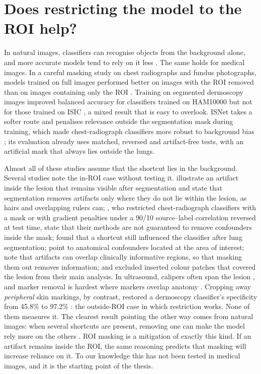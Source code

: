 \documentclass[11pt,a4paper]{article}
\begin{document}
\section{Does restricting the model to the ROI help?}
In natural images, classifiers can recognise objects from the background alone, and more accurate models tend to rely
on it less \citep{xiao2021noise}. The same holds for medical images. In a careful masking study on chest radiographs
and fundus photographs, models trained on full images performed better on images with the ROI removed than on images
containing only the ROI \citep{sourget2025mask}. Training on segmented dermoscopy images improved balanced accuracy for
classifiers trained on HAM10000 but not for those trained on ISIC \citep{maron2021confounding}, a mixed result that is
easy to overlook. ISNet takes a softer route and penalises relevance outside the segmentation mask during training,
which made chest-radiograph classifiers more robust to background bias \citep{bassi2024isnet}; its evaluation already
uses matched, reversed and artifact-free tests, with an artificial mark that always lies outside the lungs.

Almost all of these studies assume that the shortcut lies in the background. Several studies note the in-ROI case without testing it. \citet{maron2021confounding} illustrate an artifact inside the lesion that remains visible after segmentation and state that segmentation removes artifacts only where they do not lie within the lesion, as hairs and overlapping rulers can; \citet{viviano2021saliency}, who restricted chest-radiograph classifiers with a mask or with gradient penalties under a 90/10 source--label correlation reversed at test time, state that their methods are not guaranteed to remove confounders inside the mask; \citet{benahmed2022multisite} found that a shortcut still influenced the classifier after lung segmentation; \citet{sourget2025mask} point to anatomical confounders located at the area of interest; \citet{pahde2023r2r,pahde2025ensuring} note that artifacts can overlap clinically informative regions, so that masking them out removes information; and \citet{nauta2022uncovering} excluded inserted colour patches that covered the lesion from their main analysis. In ultrasound, calipers often span the lesion \citep{bunnell2024busclean}, and marker removal is hardest where markers overlap anatomy \citep{wang2026echodm}. Cropping away \emph{peripheral} skin markings, by contrast, restored a dermoscopy classifier's specificity from 45.8\% to 97.2\% \citep{winkler2019markings}: the outside-ROI case in which restriction works. None of them measures it. The clearest result pointing the other way comes
from natural images: when several shortcuts are present, removing one can make the model rely more on the others
\citep{li2023whacamole}. ROI masking is a mitigation of exactly this kind. If an artifact remains inside the ROI, the
same reasoning predicts that masking will increase reliance on it. To our knowledge this has not been tested in medical
images, and it is the starting point of the thesis.
\end{document}
